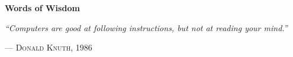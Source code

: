 \documentclass{article}
\begin{document}
	

\begin{center}
	\large\textbf{Words of Wisdom}
	
	\vspace{0.25cm}
	\small\textit{``Computers are good at following instructions, but not at reading your mind.''}
	
	\vspace{0.25cm}
	\textsc{--- Donald Knuth, 1986}
\end{center}
\end{document}

